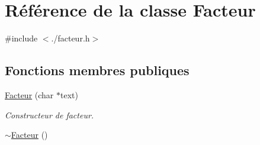 \hypertarget{classFacteur}{
\section{Référence de la classe Facteur}
\label{classFacteur}
}


{\ttfamily \#include $<$./facteur.h$>$}

\subsection*{Fonctions membres publiques}
\begin{DoxyCompactItemize}
\item 
\hyperlink{classFacteur_af0d4423b4ebe026d9dbe8ef06eb23d9f}{Facteur} (char $\ast$text)
\begin{DoxyCompactList}\small\item\em Constructeur de facteur. \item\end{DoxyCompactList}\item 
\hypertarget{classFacteur_a71486fcb174b3a49520bf1e60fbf8e69}{
\hyperlink{classFacteur_a71486fcb174b3a49520bf1e60fbf8e69}{$\sim$Facteur} ()}
\label{classFacteur_a71486fcb174b3a49520bf1e60fbf8e69}


\end{DoxyCompactItemize}
